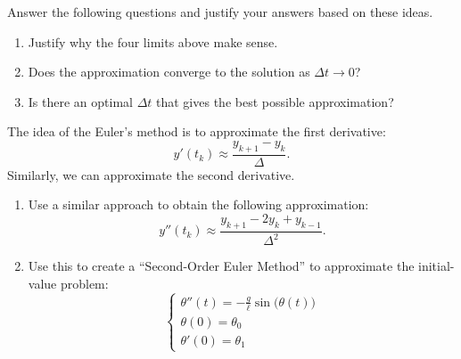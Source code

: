 \begin{exercises}
\begin{problist}
	Answer the following questions and justify your answers based on these ideas.
	\begin{enumerate}
		\item Justify why the four limits above make sense.
		\item Does the approximation converge to the solution as $\Delta t \to 0$?
		\item Is there an optimal $\Delta t$ that gives the best possible approximation?
	\end{enumerate}
	
	
	\prob The idea of the Euler's method is to approximate the first derivative:
	$$
	y'(t_k) \approx \frac{y_{k+1}-y_k}{\Delta}.
	$$
	Similarly, we can approximate the second derivative.
	\begin{enumerate}
		\item Use a similar approach to obtain the following approximation:
		$$
		y''(t_k) \approx \frac{y_{k+1} - 2 y_k + y_{k-1}}{\Delta^2}.
		$$
		\item Use this to create a ``Second-Order Euler Method'' to approximate the initial-value problem:
		$$
		\begin{cases}
			\theta''(t) = - \frac{g}{\ell} \sin\big(\theta(t)\big) \\
			\theta(0)=\theta_0 \\
			\theta'(0) = \theta_1
		\end{cases}
		$$

	\end{enumerate}

	
	
	\end{problist}
\end{exercises}